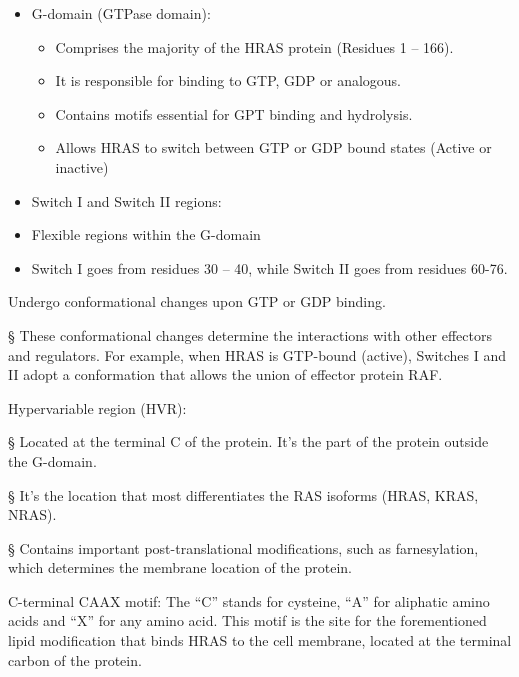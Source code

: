 \documentclass{article}
\begin{document}
\begin{itemize}
    \item G-domain (GTPase domain):
    \begin{itemize}
        \item Comprises the majority of the HRAS protein (Residues 1 – 166).
        
        \item It is responsible for binding to GTP, GDP or analogous.
        
        \item Contains motifs essential for GPT binding and hydrolysis.
        
        \item Allows HRAS to switch between GTP or GDP bound states (Active or inactive)
    \end{itemize}

    \item Switch I and Switch II regions:

    \item Flexible regions within the G-domain
\end{itemize}

\begin{itemize}
    \item Switch I goes from residues 30 – 40, while Switch II goes from residues 60-76.
\end{itemize}

Undergo conformational changes upon GTP or GDP binding.

§ These conformational changes determine the interactions with other effectors and regulators. For example, when HRAS is GTP-bound (active), Switches I and II adopt a conformation that allows the union of effector protein RAF.

Hypervariable region (HVR):

§ Located at the terminal C of the protein. It’s the part of the protein outside the G-domain.

§ It’s the location that most differentiates the RAS isoforms (HRAS, KRAS, NRAS).

§ Contains important post-translational modifications, such as farnesylation, which determines the membrane location of the protein.

C-terminal CAAX motif: The “C” stands for cysteine, “A” for aliphatic amino acids and “X” for any amino acid. This motif is the site for the forementioned lipid modification that binds HRAS to the cell membrane, located at the terminal carbon of the protein.
\end{document}
